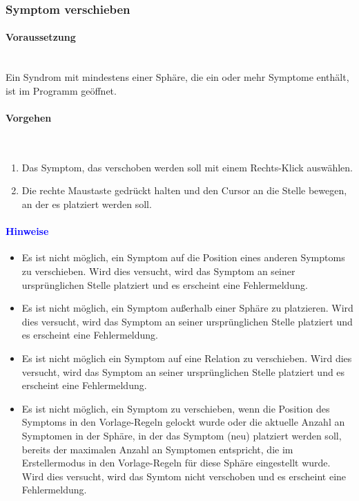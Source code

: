 \documentclass[enabledeprecatedfontcommands,fontsize=11pt,paper=a4,twoside]{scrartcl}
\newcommand*{\hint}{\paragraph{\textcolor{blue}{Hinweise}}}
\newcommand*{\condition}{\paragraph{Voraussetzung}$\;$ \vspace{0.2cm}\\}
\newcommand*{\actions}{\paragraph{Vorgehen} $\;$\vspace{0.2cm}\\}
\begin{document}
		\subsubsection{Symptom verschieben}
					\condition 	
		Ein Syndrom mit mindestens einer Sphäre, die ein oder mehr Symptome enthält, ist im Programm geöffnet. 
		\actions
		\begin{enumerate}
			\item Das Symptom, das verschoben werden soll mit einem Rechts-Klick auswählen. 
			\item Die rechte Maustaste gedrückt halten und den Cursor an die Stelle bewegen, an der es platziert werden soll.
		\end{enumerate}
		\hint
		\begin{itemize}
			\item Es ist nicht möglich, ein Symptom auf die Position eines anderen Symptoms zu verschieben. Wird dies versucht, wird das Symptom an seiner ursprünglichen Stelle platziert und es erscheint eine Fehlermeldung.
			\item Es ist nicht möglich, ein Symptom außerhalb einer Sphäre zu platzieren. Wird dies versucht, wird das Symptom an seiner ursprünglichen Stelle platziert und es erscheint eine Fehlermeldung.
			\item Es ist nicht möglich ein Symptom auf eine Relation zu verschieben. Wird dies versucht, wird das Symptom an seiner ursprünglichen Stelle platziert und es erscheint eine Fehlermeldung.
			\item Es ist nicht möglich, ein Symptom zu verschieben, wenn die Position des Symptoms in den Vorlage-Regeln gelockt wurde oder die aktuelle Anzahl an Symptomen in der Sphäre, in der das Symptom (neu) platziert werden soll, bereits der maximalen Anzahl an Symptomen entspricht, die im Erstellermodus in den Vorlage-Regeln für diese Sphäre eingestellt wurde. Wird dies versucht, wird das Symtom nicht verschoben und es erscheint eine Fehlermeldung.
		\end{itemize}
\end{document}

